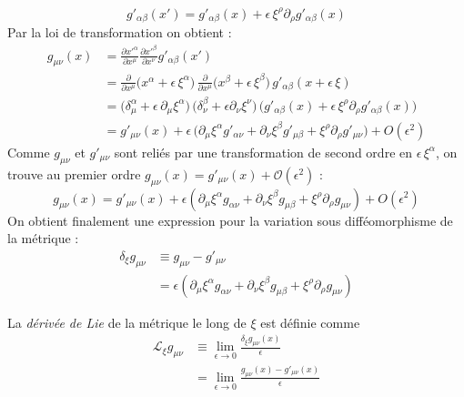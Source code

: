 \begin{equation}
    g'_{\alpha \beta}(x') = g'_{\alpha \beta}(x) + \epsilon \, \xi^{\rho}\partial_{\rho}g'_{\alpha \beta}(x)
\end{equation}
Par la loi de transformation on obtient :
\begin{align}
    g_{\mu \nu}(x) &= \frac{\partial x'^{\alpha}}{ \partial x^{\mu}}\frac{\partial x'^{\beta}}{\partial x^{\nu}}g'_{\alpha \beta}(x')\\
    &= \frac{\partial}{\partial x^{\mu}}\big(x^{\alpha} + \epsilon \, \xi^{\alpha} \big) \, \frac{\partial}{\partial x^{\mu}}\big(x^{\beta} + \epsilon \, \xi^{\beta}\big) \,g'_{\alpha \beta}(x + \epsilon \,\xi)\\
    &= \big(\delta^{\alpha}_{\mu} + \epsilon \,\partial_{\mu}\xi^{\alpha}\big)\, \big(\delta^{\beta}_{\nu} + \epsilon\partial_{\nu}\xi^{\nu}\big) \, \big(g'_{\alpha \beta}(x) + \epsilon \, \xi^{\rho}\partial_{\rho}g'_{\alpha \beta}(x)\big)\\
    &= g'_{\mu \nu}(x) + \epsilon\, \big (\partial_{\mu}\xi^{\alpha}g'_{\alpha \nu} + \partial_{\nu}\xi^{\beta}g'_{\mu \beta} + \xi^{\rho}\partial_{\rho}g'_{\mu \nu} \big) + O(\epsilon^2)
\end{align}
Comme $g_{\mu\nu}$ et $g'_{\mu\nu}$ sont reliés par une transformation de second ordre en $\epsilon\,\xi^\alpha$, on trouve au premier ordre $g_{\mu\nu}(x) = g'_{\mu\nu}(x) + \mathcal{O}(\epsilon^2)$ :
\begin{equation}
     g_{\mu \nu}(x) = g'_{\mu \nu}(x) + \epsilon(\partial_{\mu}\xi^{\alpha}g_{\alpha \nu} + \partial_{\nu}\xi^{\beta}g_{\mu \beta} + \xi^{\rho}\partial_{\rho}g_{\mu \nu}) + O(\epsilon^2)
\end{equation}
On obtient finalement une expression pour la variation sous difféomorphisme de la métrique :
\begin{align}
    \delta_{\xi}g_{\mu \nu} &\equiv g_{\mu\nu} -g'_{\mu\nu} \\
    &= \epsilon(\partial_{\mu}\xi^{\alpha}g_{\alpha \nu} + \partial_{\nu}\xi^{\beta}g_{\mu \beta} + \xi^{\rho}\partial_{\rho}g_{\mu \nu}) 
\end{align}

\begin{theoremframe}
    \begin{defi}
        La \emph{dérivée de Lie} de la métrique le long de $\xi$ est définie comme
        \begin{align}
            \mathcal{L}_{\xi}g_{\mu \nu} &\equiv \lim_{\epsilon \rightarrow 0} \frac{\delta_{\xi}g_{\mu \nu}(x)}{\epsilon}\\
            &= \lim_{\epsilon \rightarrow 0} \frac{g_{\mu \nu}(x) - g'_{\mu \nu}(x)}{\epsilon}
        \end{align}
    \end{defi}
\end{theoremframe}

